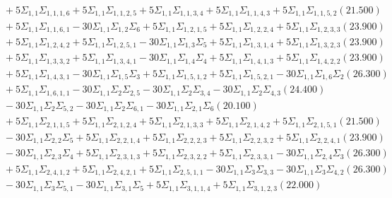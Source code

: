 \documentclass[12pt]{article}
\begin{document}
\begin{landscape}
\begin{align*}
		&\quad\quad +5\Sigma_{1,1}\Sigma_{1,1,1,6}+5\Sigma_{1,1}\Sigma_{1,1,2,5}+5\Sigma_{1,1}\Sigma_{1,1,3,4}+5\Sigma_{1,1}\Sigma_{1,1,4,3}+5\Sigma_{1,1}\Sigma_{1,1,5,2}(21.500) \\ 
		&\quad\quad +5\Sigma_{1,1}\Sigma_{1,1,6,1}-30\Sigma_{1,1}\Sigma_{1,2}\Sigma_{6}+5\Sigma_{1,1}\Sigma_{1,2,1,5}+5\Sigma_{1,1}\Sigma_{1,2,2,4}+5\Sigma_{1,1}\Sigma_{1,2,3,3}(23.900) \\ 
		&\quad\quad +5\Sigma_{1,1}\Sigma_{1,2,4,2}+5\Sigma_{1,1}\Sigma_{1,2,5,1}-30\Sigma_{1,1}\Sigma_{1,3}\Sigma_{5}+5\Sigma_{1,1}\Sigma_{1,3,1,4}+5\Sigma_{1,1}\Sigma_{1,3,2,3}(23.900) \\ 
		&\quad\quad +5\Sigma_{1,1}\Sigma_{1,3,3,2}+5\Sigma_{1,1}\Sigma_{1,3,4,1}-30\Sigma_{1,1}\Sigma_{1,4}\Sigma_{4}+5\Sigma_{1,1}\Sigma_{1,4,1,3}+5\Sigma_{1,1}\Sigma_{1,4,2,2}(23.900) \\ 
		&\quad\quad +5\Sigma_{1,1}\Sigma_{1,4,3,1}-30\Sigma_{1,1}\Sigma_{1,5}\Sigma_{3}+5\Sigma_{1,1}\Sigma_{1,5,1,2}+5\Sigma_{1,1}\Sigma_{1,5,2,1}-30\Sigma_{1,1}\Sigma_{1,6}\Sigma_{2}(26.300) \\ 
		&\quad\quad +5\Sigma_{1,1}\Sigma_{1,6,1,1}-30\Sigma_{1,1}\Sigma_{2}\Sigma_{2,5}-30\Sigma_{1,1}\Sigma_{2}\Sigma_{3,4}-30\Sigma_{1,1}\Sigma_{2}\Sigma_{4,3}(24.400) \\ 
		&\quad\quad -30\Sigma_{1,1}\Sigma_{2}\Sigma_{5,2}-30\Sigma_{1,1}\Sigma_{2}\Sigma_{6,1}-30\Sigma_{1,1}\Sigma_{2,1}\Sigma_{6}(20.100) \\ 
		&\quad\quad +5\Sigma_{1,1}\Sigma_{2,1,1,5}+5\Sigma_{1,1}\Sigma_{2,1,2,4}+5\Sigma_{1,1}\Sigma_{2,1,3,3}+5\Sigma_{1,1}\Sigma_{2,1,4,2}+5\Sigma_{1,1}\Sigma_{2,1,5,1}(21.500) \\ 
		&\quad\quad -30\Sigma_{1,1}\Sigma_{2,2}\Sigma_{5}+5\Sigma_{1,1}\Sigma_{2,2,1,4}+5\Sigma_{1,1}\Sigma_{2,2,2,3}+5\Sigma_{1,1}\Sigma_{2,2,3,2}+5\Sigma_{1,1}\Sigma_{2,2,4,1}(23.900) \\ 
		&\quad\quad -30\Sigma_{1,1}\Sigma_{2,3}\Sigma_{4}+5\Sigma_{1,1}\Sigma_{2,3,1,3}+5\Sigma_{1,1}\Sigma_{2,3,2,2}+5\Sigma_{1,1}\Sigma_{2,3,3,1}-30\Sigma_{1,1}\Sigma_{2,4}\Sigma_{3}(26.300) \\ 
		&\quad\quad +5\Sigma_{1,1}\Sigma_{2,4,1,2}+5\Sigma_{1,1}\Sigma_{2,4,2,1}+5\Sigma_{1,1}\Sigma_{2,5,1,1}-30\Sigma_{1,1}\Sigma_{3}\Sigma_{3,3}-30\Sigma_{1,1}\Sigma_{3}\Sigma_{4,2}(26.300) \\ 
		&\quad\quad -30\Sigma_{1,1}\Sigma_{3}\Sigma_{5,1}-30\Sigma_{1,1}\Sigma_{3,1}\Sigma_{5}+5\Sigma_{1,1}\Sigma_{3,1,1,4}+5\Sigma_{1,1}\Sigma_{3,1,2,3}(22.000) \\ 

\end{align*}
\end{landscape}
\end{document}
